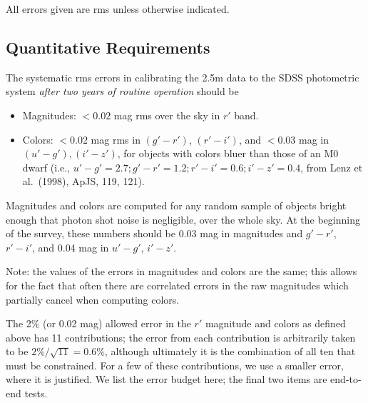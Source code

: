 All errors given are rms unless otherwise indicated. 

\subsection{Quantitative Requirements}

The systematic rms errors in calibrating the 2.5m data to the SDSS
photometric system {\em after two years of routine operation} should be

\begin{itemize}
\item Magnitudes: $< 0.02$ mag rms over the sky in $r'$ band.

\item Colors: $< 0.02$ mag rms in $(g'-r')$, $(r'-i')$, and
$< 0.03$ mag in  $(u'-g'), (i'-z')$, for objects with colors bluer than those of
an M0 dwarf (i.e., $u'-g' = 2.7; g'-r' = 1.2; r'-i' = 0.6; i' - z'
= 0.4$, from Lenz et al.~(1998), ApJS, 119, 121).
\end{itemize}

Magnitudes and colors are computed for any random sample of objects bright enough
that photon shot noise is negligible, over the whole
sky.  At the beginning of the survey, these numbers should be 0.03 mag
in magnitudes and $g'-r'$, $r'-i'$, and 0.04 mag in $u'-g'$, $i'-z'$. 

Note: the values of the errors in magnitudes and colors are the same;
this allows for the fact that often there are correlated
errors in the raw magnitudes which partially cancel when computing colors.

The 2\% (or 0.02 mag) allowed error in the $r'$ magnitude and colors as defined above
has 11 contributions; the error from each contribution is arbitrarily
taken to be $2\%/\sqrt{11} = 0.6\%$, although ultimately it is the
combination of all ten that must be constrained.  For a few of these
contributions, we use a smaller error, where it is justified.  We list the error
budget here; the final two items are end-to-end tests. 

